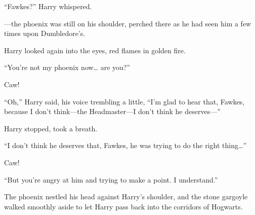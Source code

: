 ``Fawkes?'' Harry whispered.

---the phoenix was still on his shoulder, perched there as he had seen
him a few times upon Dumbledore's.

Harry looked again into the eyes, red flames in golden fire.

``You're not my phoenix now\ldots{} are you?''

Caw!

``Oh,'' Harry said, his voice trembling a little, ``I'm glad to hear
that, Fawkes, because I don't think---the Headmaster---I don't think he
deserves---''

Harry stopped, took a breath.

``I don't think he deserves that, Fawkes, he was trying to do the right
thing\ldots{}''

Caw!

``But you're angry at him and trying to make a point. I understand.''

The phoenix nestled his head against Harry's shoulder, and the stone
gargoyle walked smoothly aside to let Harry pass back into the corridors
of Hogwarts.
